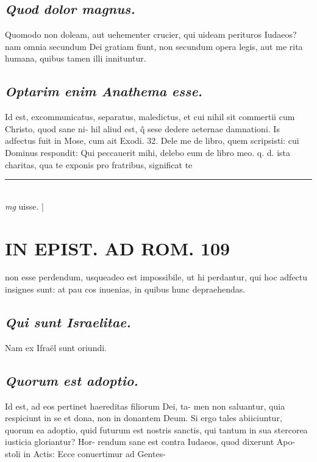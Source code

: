 \documentclass{article}
\begin{document}
\begin{pages}
\subsection*{\textit{Quod dolor magnus. }}\pstart Quomodo non doleam, aut uehementer crucier, qui uideam perituros Iudaeos? nam omnia secundum Dei gratiam fiunt, non secundum opera legis, aut me rita humana, quibus tamen illi innituntur.   \pend
{}
{}
\subsection*{\textit{Optarim enim Anathema esse. }}\pstart Id est, excommunicatus, separatus, maledictus, et cui nihil sit commertii cum Christo, quod sane ni- hil aliud est, q̃ sese dedere aeternae damnationi. Is adfectus fuit in Mose, cum ait Exodi. 32. Dele me de libro, quem scripsisti: cui Dominus respondit: Qui peccauerit mihi, delebo eum de libro meo. q. d. ista charitas, qua te exponis pro fratribus, significat te  \pend
\vspace{0.5cm}\noindent
\vspace{0.2cm}\rule{1cm}{0.2pt}\\ 
\hspace{0.2cm}\textit{mg}
\footnotesize uisse. 
\normalsize| 
\section*{IN EPIST. AD ROM.  109 }
\marginpar{[ p.]}\pstart non esse perdendum, usqueadeo est impossibile, ut hi perdantur, qui hoc adfectu insignes sunt: at pau cos inuenias, in quibus hunc depraehendas.   \pend
{}
{}
\subsection*{\textit{Qui sunt Israelitae. }}\pstart Nam ex Ifraël sunt oriundi.   \pend
{}
{}
\subsection*{\textit{Quorum est adoptio. }}\pstart Id est, ad eos pertinet haereditas filiorum Dei, ta- men non saluantur, quia respiciunt in se et dona, non in donantem Deum. Si ergo tales abiiciuntur, quorum ea adoptio, quid futurum est nostris sanctis, qui tantum in sua stercorea iusticia gloriantur? Hor- rendum sane est contra Iudaeos, quod dixerunt Apo- stoli in Actis: Ecce conuertimur ad Gentes-  \pend
{}
{}

\end{pages}
\end{document}
